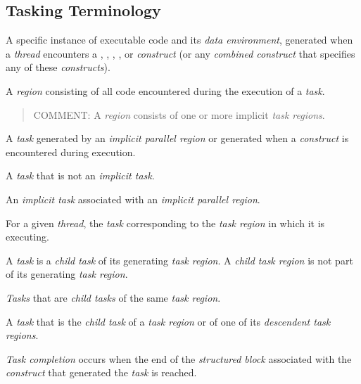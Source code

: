 \subsection{Tasking Terminology}
\label{subsec:Tasking Terminology}
\glossarydefstart
A specific instance of executable code and its \emph{data environment}, generated when a 
\emph{thread} encounters a , , , , or
 \emph{construct} (or any \emph{combined construct} that specifies
any of these \emph{constructs}).
\glossarydefend

\glossarydefstart
A \emph{region} consisting of all code encountered during the execution of a \emph{task}. 

\begin{quote}
COMMENT: A  \emph{region} consists of one or more implicit \emph{task regions}. 
\end{quote}
\glossarydefend

\glossarydefstart
A \emph{task} generated by an \emph{implicit parallel region} or generated when a 
\emph{construct} is encountered during execution.
\glossarydefend

\glossarydefstart
A \emph{task} that is not an \emph{implicit task}.
\glossarydefend

\glossarydefstart
An \emph{implicit task} associated with an \emph{implicit parallel region}.
\glossarydefend

\glossarydefstart
For a given \emph{thread}, the \emph{task} corresponding to the \emph{task region} in which it is 
executing.
\glossarydefend

\glossarydefstart
A \emph{task} is a \emph{child task} of its generating \emph{task region}. 
A \emph{child task region} is not part of its generating \emph{task region}.
\glossarydefend

\glossarydefstart
\emph{Tasks} that are \emph{child tasks} of the same \emph{task region}.
\glossarydefend

\glossarydefstart
A \emph{task} that is the \emph{child task} of a \emph{task region} or of one of its 
\emph{descendent task regions}.
\glossarydefend

\glossarydefstart
\emph{Task completion} occurs when the end of the \emph{structured block} associated with the 
\emph{construct} that generated the \emph{task} is reached.

